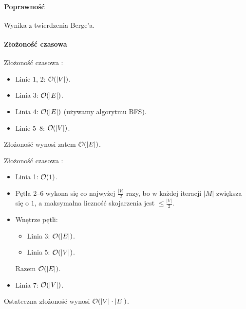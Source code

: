 \paragraph{Poprawność} Wynika z twierdzenia Berge'a.

\paragraph{Złożoność czasowa}

Złożoność czasowa \textnormal{}:
\begin{itemize}[nosep]
	\item Linie 1, 2: $\mathcal{O}(|V|)$.
	\item Linia 3: $\mathcal{O}(|E|)$.
	\item Linia 4: $\mathcal{O}(|E|)$ (używamy algorytmu BFS).
	\item Linie 5--8: $\mathcal{O}(|V|)$.
\end{itemize}
Złożoność \textnormal{} wynosi zatem $\mathcal{O}(|E|)$.

Złożoność czasowa \textnormal{}:
\begin{itemize}[nosep]
	\item Linia 1: $\mathcal{O}(1)$.
	\item Pętla 2--6 wykona się co najwyżej $\frac{|V|}{2}$ razy, bo w każdej iteracji $|M|$ zwiększa się o $1$, a maksymalna liczność skojarzenia jest $\le \frac{|V|}{2}$.
	\item Wnętrze pętli:
	      \begin{itemize}[nosep]
		      \item Linia 3: $\mathcal{O}(|E|)$.
		      \item Linia 5: $\mathcal{O}(|V|)$.
	      \end{itemize}
	      Razem $\mathcal{O}(|E|)$.
	\item Linia 7: $\mathcal{O}(|V|)$.
\end{itemize}
Ostateczna złożoność \textnormal{} wynosi $\mathcal{O}(|V| \cdot |E|)$.


